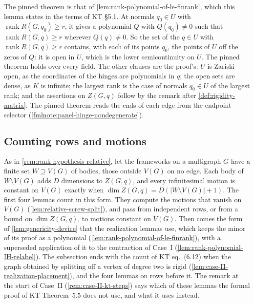 \begin{fmlnote}
  The pinned theorem is that of
  \cref{lem:rank-polynomial-of-le-finrank}, which this lemma states in
  the terms of KT \S5.1. At normals $q_0 \in U$ with
  $\operatorname{rank} R(G,q_0) \ge r$, it gives a polynomial $Q$ with
  $Q(q_0) \neq 0$ such that $\operatorname{rank} R(G,q) \ge r$ wherever
  $Q(q) \neq 0$. So the set of the $q \in U$ with
  $\operatorname{rank} R(G,q) \ge r$ contains, with each of its points
  $q_0$, the points of $U$ off the zeros of $Q$: it is open in $U$, which
  is the lower semicontinuity on $U$. The pinned theorem holds over every
  field. The other clauses are the proof's: $U$ is Zariski-open, as the
  coordinates of the hinges are polynomials in $q$; the open sets are
  dense, as $K$ is infinite; the largest rank is the case of normals
  $q_0 \in U$ of the largest rank; and the assertions on $Z(G,q)$ follow
  by the remark after \cref{def:rigidity-matrix}. The pinned theorem
  reads the ends of each edge from the endpoint selector
  (\cref{fmlnote:panel-hinge-nondegenerate}).
\end{fmlnote}

\subsection{Counting rows and motions}
\label{sec:molecular-algebraic-induction-relative}

As in \cref{rem:rank-hypothesis-relative}, let the frameworks on a
multigraph $G$ have a finite set $W \supseteq V(G)$ of bodies, those
outside $V(G)$ on no edge. Each body of $W \setminus V(G)$ adds $D$
dimensions to $Z(G,q)$, and every infinitesimal motion is constant on
$V(G)$ exactly when $\dim Z(G,q) = D(|W \setminus V(G)| + 1)$. The first
four lemmas count in this form. They compute the motions that vanish on
$V(G)$ (\cref{lem:relative-screw-split}), and pass from independent rows, or
from a bound on $\dim Z(G,q)$, to motions constant on $V(G)$. Then
comes the form of \cref{lem:genericity-device} that the realization
lemmas use, which keeps the minor of its proof as a polynomial
(\cref{lem:rank-polynomial-of-le-finrank}), with a superseded
application of it to the contraction of Case~I
(\cref{lem:rank-polynomial-IH-relabel}). The subsection ends with the
count of KT eq.~(6.12) when the graph obtained by splitting off a vertex
of degree two is rigid (\cref{lem:case-II-realization-placement}), and
the four lemmas on rows before it. The remark at the start of Case~II
(\cref{rem:case-II-kt-steps}) says which of these lemmas the formal
proof of KT Theorem~5.5 does not use, and what it uses instead.

